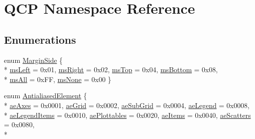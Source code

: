 \hypertarget{namespaceQCP}{}\section{Q\+CP Namespace Reference}
\label{namespaceQCP}
\subsection*{Enumerations}
\begin{DoxyCompactItemize}
\item 
enum \hyperlink{namespaceQCP_a7e487e3e2ccb62ab7771065bab7cae54}{Margin\+Side} \{ \\*
\hyperlink{namespaceQCP_a7e487e3e2ccb62ab7771065bab7cae54a9500c8bfcc9e80b9dff0a8e00e867f07}{ms\+Left} = 0x01, 
\hyperlink{namespaceQCP_a7e487e3e2ccb62ab7771065bab7cae54a93c719593bb2b94ed244d52c86d83b65}{ms\+Right} = 0x02, 
\hyperlink{namespaceQCP_a7e487e3e2ccb62ab7771065bab7cae54a5db8fb0d0b0ecf0d611c2602a348e8a0}{ms\+Top} = 0x04, 
\hyperlink{namespaceQCP_a7e487e3e2ccb62ab7771065bab7cae54a5241d8eac2bab9524a38889f576179cc}{ms\+Bottom} = 0x08, 
\\*
\hyperlink{namespaceQCP_a7e487e3e2ccb62ab7771065bab7cae54a43d7361cb0c5244eabdc962021bffebc}{ms\+All} = 0x\+FF, 
\hyperlink{namespaceQCP_a7e487e3e2ccb62ab7771065bab7cae54a80aa4149f16dabd538f8b2e3d42c42d5}{ms\+None} = 0x00
 \}
\item 
enum \hyperlink{namespaceQCP_ae55dbe315d41fe80f29ba88100843a0c}{Antialiased\+Element} \{ \\*
\hyperlink{namespaceQCP_ae55dbe315d41fe80f29ba88100843a0caefa92e89cd37f8a081fd2075aa1af73f}{ae\+Axes} = 0x0001, 
\hyperlink{namespaceQCP_ae55dbe315d41fe80f29ba88100843a0ca4fbb37118d62288af0ca601ff2b07a2f}{ae\+Grid} = 0x0002, 
\hyperlink{namespaceQCP_ae55dbe315d41fe80f29ba88100843a0caaedf83369188a15a69f92bb1d85ca97b}{ae\+Sub\+Grid} = 0x0004, 
\hyperlink{namespaceQCP_ae55dbe315d41fe80f29ba88100843a0ca9e0127a6361b5d0596b031a482c5cf97}{ae\+Legend} = 0x0008, 
\\*
\hyperlink{namespaceQCP_ae55dbe315d41fe80f29ba88100843a0ca1aca7a50c1b95403958733a4acafe773}{ae\+Legend\+Items} = 0x0010, 
\hyperlink{namespaceQCP_ae55dbe315d41fe80f29ba88100843a0ca4145e4251b0cf2dbedabeea0a38f84f6}{ae\+Plottables} = 0x0020, 
\hyperlink{namespaceQCP_ae55dbe315d41fe80f29ba88100843a0caf7712a85d6b0c75b24301d2fe9484db3}{ae\+Items} = 0x0040, 
\hyperlink{namespaceQCP_ae55dbe315d41fe80f29ba88100843a0cae45ed8cd167bffe27d7f40da4bc17e9c}{ae\+Scatters} = 0x0080, 
\\*

\end{DoxyCompactItemize}
